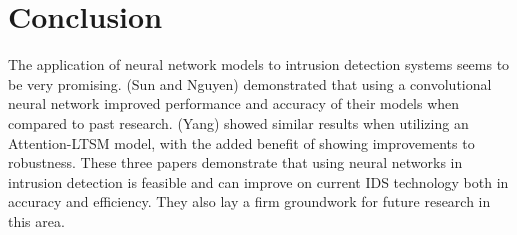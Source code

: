 \section{Conclusion}
The application of neural network models to intrusion detection systems seems to be very promising. (Sun and Nguyen) demonstrated that using a convolutional neural
network improved performance and accuracy of their models when compared to past research. (Yang) showed similar results when utilizing an Attention-LTSM model, with 
the added benefit of showing improvements to robustness. These three papers demonstrate that using neural networks in intrusion detection is feasible and can 
improve on current IDS technology both in accuracy and efficiency. They also lay a firm groundwork for future research in this area. 

